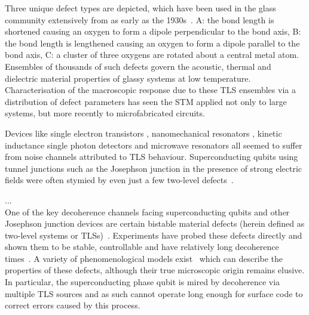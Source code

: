Three unique defect types are depicted, which have been used in the glass community extensively from as early as the 1930s~\cite{Zachariasen1932}.
A: the bond length is shortened causing an oxygen to form a dipole perpendicular to the bond axis, B: the bond length is lengthened causing an oxygen to form a dipole parallel to the bond axis, C: a cluster of three oxygens are rotated about a central metal atom.
Ensembles of thousands of such defects govern the acoustic, thermal and dielectric material properties of glassy systems at low temperature.
Characterisation of the macroscopic response due to these TLS ensembles via a distribution of defect parameters \cite{Enss2005} has seen the STM applied not only to large systems, but more recently to microfabricated circuits.

Devices like single electron transistors \cite{Zimmerli1992}, nanomechanical resonators \cite{Ahn2003}, kinetic inductance single photon detectors and microwave resonators \cite{Gao2007} all seemed to suffer from noise channels attributed to TLS behaviour.
Superconducting qubits using tunnel junctions such as the Josephson junction in the presence of strong electric fields were often stymied by even just a few two-level defects~\cite{Simmonds2004}.




...\\



One of the key decoherence channels facing superconducting qubits and other Josephson junction devices are certain bistable material defects (herein defined as two-level systems or TLSs)~\cite{Dutta1981, Shnirman2005}.
Experiments have probed these defects directly and shown them to be stable, controllable and have relatively long decoherence times~\cite{Simmonds2004, Neeley2008, Shalibo2010, Lupascu2009, Lisenfeld2010, Gunnarsson2013}.
A variety of phenomenological models exist~\cite{Martinis2005, deSousa2009, Sendelbach2008, Faoro2007,Ku2005} which can describe the properties of these defects, although their true microscopic origin remains elusive.
In particular, the superconducting phase qubit is mired by decoherence via multiple TLS sources and as such cannot operate long enough for surface code to correct errors caused by this process.



